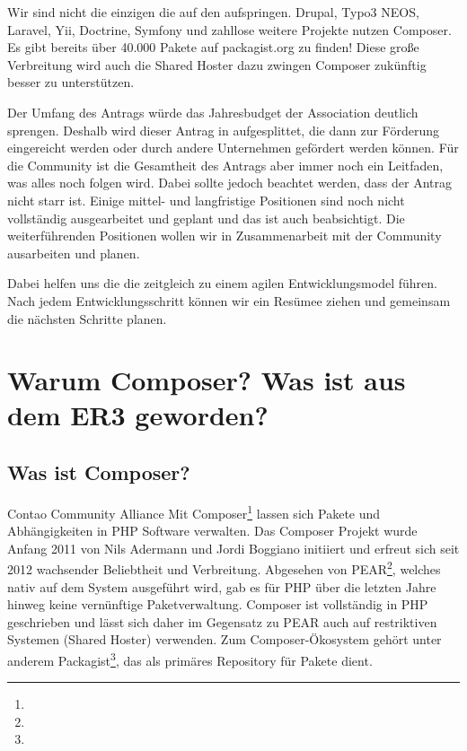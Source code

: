 \documentclass[
paper=a4,
draft=false,%
fontsize=10pt%
]{scrartcl}
\begin{document}
Wir sind nicht die einzigen die auf den  aufspringen. Drupal, Typo3 NEOS, Laravel, Yii, Doctrine, Symfony und zahllose weitere Projekte nutzen Composer. Es gibt bereits über 40.000 Pakete auf packagist.org zu finden! Diese große Verbreitung wird auch die Shared Hoster dazu zwingen Composer zukünftig besser zu unterstützen.

Der Umfang des Antrags würde das Jahresbudget der Association deutlich sprengen. Deshalb wird dieser Antrag in  aufgesplittet, die dann zur Förderung eingereicht werden oder durch andere Unternehmen gefördert werden können.
Für die Community ist die Gesamtheit des Antrags aber immer noch ein Leitfaden, was alles noch folgen wird.
Dabei sollte jedoch beachtet werden, dass der Antrag nicht starr ist. Einige mittel- und langfristige Positionen sind noch nicht vollständig ausgearbeitet und geplant und das ist auch beabsichtigt. Die weiterführenden Positionen wollen wir in Zusammenarbeit mit der Community ausarbeiten und planen.

Dabei helfen uns die  die zeitgleich zu einem agilen Entwicklungsmodel führen. Nach jedem Entwicklungsschritt können wir ein Resümee ziehen und gemeinsam die nächsten Schritte planen.

\newpage

%
%

\section{Warum Composer? Was ist aus dem ER3 geworden?}
\label{sec:why-composer}

\subsection{Was ist Composer?}

\begin{emquote}{Contao Community Alliance}
Mit Composer\footnote{} lassen sich Pakete und Abhängigkeiten in PHP Software verwalten. Das Composer Projekt wurde Anfang 2011 von Nils Adermann und Jordi Boggiano initiiert und erfreut sich seit 2012 wachsender Beliebtheit und Verbreitung. Abgesehen von PEAR\footnote{}, welches nativ auf dem System ausgeführt wird, gab es für PHP über die letzten Jahre hinweg keine vernünftige Paketverwaltung. Composer ist vollständig in PHP geschrieben und lässt sich daher im Gegensatz zu PEAR auch auf restriktiven Systemen (Shared Hoster) verwenden. Zum Composer-Ökosystem gehört unter anderem Packagist\footnote{}, das als primäres Repository für Pakete dient.
\end{emquote}
\end{document}
